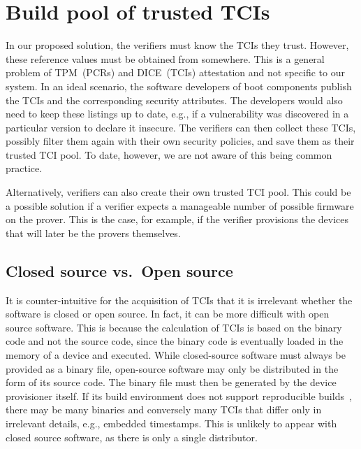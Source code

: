 \section{Build pool of trusted TCIs}

In our proposed solution, the verifiers must know the TCIs they trust.
However, these reference values must be obtained from somewhere.
This is a general problem of TPM~(PCRs) and DICE~(TCIs) attestation and not specific to our system.
In an ideal scenario, the software developers of boot components publish the TCIs and the corresponding security attributes.
The developers would also need to keep these listings up to date, e.g., if a vulnerability was discovered in a particular version to declare it insecure.
The verifiers can then collect these TCIs, possibly filter them again with their own security policies, and save them as their trusted TCI pool.
To date, however, we are not aware of this being common practice.

Alternatively, verifiers can also create their own trusted TCI pool.
This could be a possible solution if a verifier expects a manageable number of possible firmware on the prover.
This is the case, for example, if the verifier provisions the devices that will later be the provers themselves.

\subsection{Closed source vs.\ Open source}

It is counter-intuitive for the acquisition of TCIs that it is irrelevant whether the software is closed or open source.
In fact, it can be more difficult with open source software.
This is because the calculation of TCIs is based on the binary code and not the source code, since the binary code is eventually loaded in the memory of a device and executed.
While closed-source software must always be provided as a binary file, open-source software may only be distributed in the form of its source code.
The binary file must then be generated by the device provisioner itself.
If its build environment does not support reproducible builds~\cite{Lamb2022}, there may be many binaries and conversely many TCIs that differ only in irrelevant details, e.g., embedded timestamps.
This is unlikely to appear with closed source software, as there is only a single distributor.

